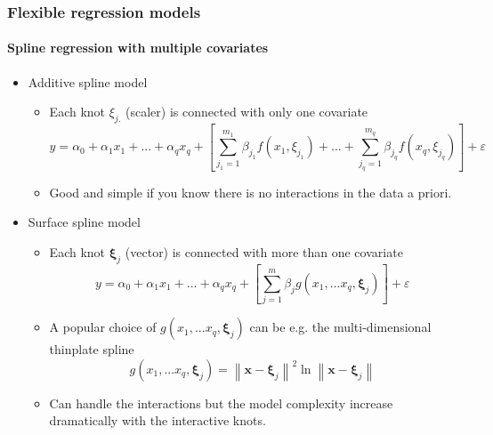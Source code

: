 \documentclass[10pt]{beamer}
\begin{document}
\begin{frame}
  \frametitle{Flexible regression models}
  \framesubtitle{Spline regression with multiple covariates}
  \begin{itemize}
  \item Additive spline model
    \begin{itemize}
    \item Each knot $\xi_{j.}$ (scaler) is connected with only one covariate
      \[y = {\alpha_0} + {\alpha _1}{x_1} + ...+{\alpha _q}{x_q} + \left[ \sum
        \limits_{j_1=1}^{m_1} \beta_{j_1} f\left( {{x_1},{\xi _{j_1}}}
        \right) + ... + \sum \limits_{j_q=1}^{m_q} \beta_{j_q} f\left( {{x_q},{\xi _{j_q}}} \right)\right] + \varepsilon \]
    \item Good and simple if you know there is no interactions in the data a priori.
    \end{itemize}
  \item Surface spline model
    \begin{itemize}
    \item Each knot $\bm{\xi}_j$ (vector) is connected with more than one covariate
      \[y = {\alpha _0} + {\alpha _1}{x_1} + ...+{\alpha _q}{x_q} + \left[ \sum
        \limits_{j=1}^{m}  \beta_j g\left(
          {{x_1},...{x_q},{\bm{\xi} _j}} \right) \right]
      + \varepsilon \]
    \item A popular choice of $g\left( {{x_1},...{x_q},{\bm{\xi} _j}} \right)$ can be
      e.g. the multi-dimensional thinplate spline
      \[g\left( {{x_1},...{x_q},{\bm{\xi} _j}} \right) = {\left\| {\bm{x} - \bm{\xi}_j
          } \right\|^2}\ln \left\| {\bm{x} - \bm{\xi}_j } \right\|\]
    \item Can handle the interactions but the model complexity increase
      dramatically with the interactive knots.
    \end{itemize}

  \end{itemize}
\end{frame}
\end{document}

